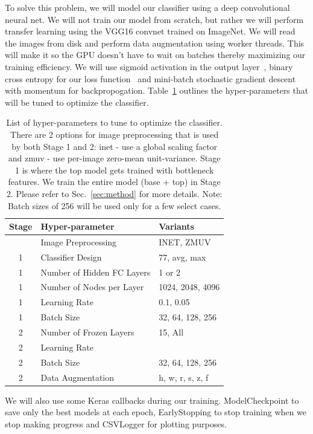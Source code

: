 \documentclass[12pt,journal,compsoc]{IEEEtran}
\begin{document}

To solve this problem, we will model our classifier using a deep convolutional neural net. We will not train our model from scratch, but rather we will perform transfer learning using the VGG16 convnet trained on ImageNet. We will read the images from disk and perform data augmentation using worker threads. This will make it so the GPU doesn't have to wait on batches thereby maximizing our training efficiency. We will use sigmoid activation in the output layer~\cite{Kurata:2016}, binary cross entropy for our loss function~\cite{deBoer2005} and mini-batch stochastic gradient descent with momentum for backpropogation. Table~\ref{tab:hyperparams} outlines the hyper-parameters that will be tuned to optimize the classifier.
\begin{table}
\caption{List of hyper-parameters to tune to optimize the classifier. There are 2 options for image preprocessing that is used by both Stage 1 and 2: inet - use a global scaling factor and zmuv - use per-image zero-mean unit-variance.  Stage 1 is where the top model gets trained with bottleneck features.
We train the entire model (base + top) in Stage 2.  Please refer to Sec.~\ref{sec:method} for more details. Note: Batch sizes of 256 will be used only for a few select cases.}
\label{tab:hyperparams}
\centering
\begin{tabular}{cll}
\toprule
Stage & Hyper-parameter & Variants \\
\midrule
 & Image Preprocessing & INET, ZMUV \\
\midrule
1 & Classifier Design & 77, avg, max \\
1 & Number of Hidden FC Layers & 1 or 2 \\
1 & Number of Nodes per Layer & 1024, 2048, 4096 \\
1 & Learning Rate & 0.1, 0.05\\
1 & Batch Size & 32, 64, 128, 256\\
\midrule
2 & Number of Frozen Layers & 15, All \\
2 & Learning Rate & \\
2 & Batch Size & 32, 64, 128, 256 \\
2 & Data Augmentation & h, w, r, s, z, f \\
\bottomrule
\end{tabular}
\end{table}
We will also use some Keras callbacks during our training.  ModelCheckpoint to save only the best models at each epoch, EarlyStopping to stop training when we stop making progress and CSVLogger for plotting purposes.
\end{document}
